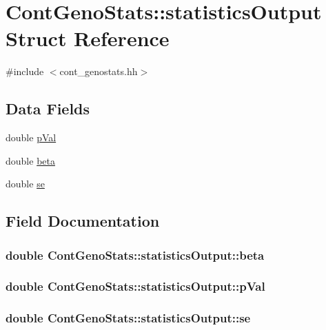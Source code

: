 \hypertarget{structContGenoStats_1_1statisticsOutput}{
\section{ContGenoStats::statisticsOutput Struct Reference}
\label{structContGenoStats_1_1statisticsOutput}
}


{\ttfamily \#include $<$cont\_\-genostats.hh$>$}

\subsection*{Data Fields}
\begin{DoxyCompactItemize}
\item 
double \hyperlink{structContGenoStats_1_1statisticsOutput_a4d6d437b66eb55c03715b3648b1ee384}{pVal}
\item 
double \hyperlink{structContGenoStats_1_1statisticsOutput_a0d0a429e17f0eb56ec25596bfacb3932}{beta}
\item 
double \hyperlink{structContGenoStats_1_1statisticsOutput_a21656aab558e73c94b6b8262225b74ff}{se}
\end{DoxyCompactItemize}


\subsection{Field Documentation}
\hypertarget{structContGenoStats_1_1statisticsOutput_a0d0a429e17f0eb56ec25596bfacb3932}{
\subsubsection[{beta}]{\setlength{\rightskip}{0pt plus 5cm}double {\bf ContGenoStats::statisticsOutput::beta}}}
\label{structContGenoStats_1_1statisticsOutput_a0d0a429e17f0eb56ec25596bfacb3932}
\hypertarget{structContGenoStats_1_1statisticsOutput_a4d6d437b66eb55c03715b3648b1ee384}{
\subsubsection[{pVal}]{\setlength{\rightskip}{0pt plus 5cm}double {\bf ContGenoStats::statisticsOutput::pVal}}}
\label{structContGenoStats_1_1statisticsOutput_a4d6d437b66eb55c03715b3648b1ee384}
\hypertarget{structContGenoStats_1_1statisticsOutput_a21656aab558e73c94b6b8262225b74ff}{
\subsubsection[{se}]{\setlength{\rightskip}{0pt plus 5cm}double {\bf ContGenoStats::statisticsOutput::se}}}
\label{structContGenoStats_1_1statisticsOutput_a21656aab558e73c94b6b8262225b74ff}


